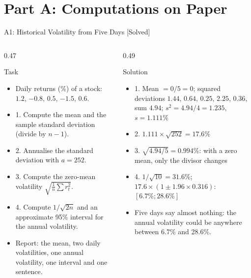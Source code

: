 \section{Part A: Computations on Paper}

\begin{frame}{A1: Historical Volatility from Five Days [Solved]}
\itemsize{\scriptsize}
\begin{columns}[T]
\begin{column}{0.47\textwidth}
\begin{block}{Task}
\begin{itemize}
    \item Daily returns (\%) of a stock: $1.2$, $-0.8$, $0.5$, $-1.5$, $0.6$.
    \item 1. Compute the mean and the sample standard deviation (divide by $n - 1$).
    \item 2. Annualise the standard deviation with $a = 252$.
    \item 3. Compute the zero-mean volatility $\sqrt{\frac{1}{n}\sum r_t^2}$.
    \item 4. Compute $1/\sqrt{2n}$ and an approximate 95\% interval for the annual volatility.
    \item Report: the mean, two daily volatilities, one annual volatility, one interval and one sentence.
\end{itemize}
\end{block}
\end{column}
\begin{column}{0.49\textwidth}
\begin{exampleblock}{Solution}
\begin{itemize}
    \item 1. Mean $= 0/5 = 0$; squared deviations $1.44$, $0.64$, $0.25$, $2.25$, $0.36$, sum $4.94$; $s^2 = 4.94/4 = 1.235$, $s = 1.111\%$
    \item 2. $1.111 \times \sqrt{252} = 17.6\%$
    \item 3. $\sqrt{4.94/5} = 0.994\%$: with a zero mean, only the divisor changes
    \item 4. $1/\sqrt{10} = 31.6\%$; $17.6 \times (1 \pm 1.96 \times 0.316)$: $[6.7\%; 28.6\%]$
    \item Five days say almost nothing: the annual volatility could be anywhere between 6.7\% and 28.6\%.
\end{itemize}
\end{exampleblock}
\end{column}
\end{columns}
\end{frame}

